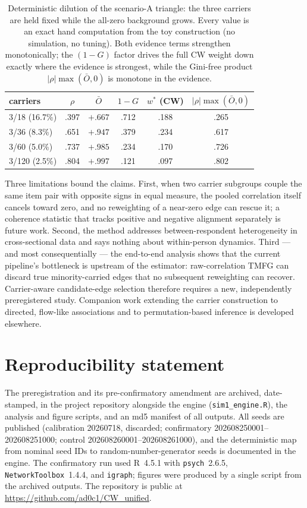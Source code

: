 \documentclass[11pt]{article}
\newcommand{\Obar}{\bar{O}}
\newcommand{\wstar}{w^{*}}
\begin{document}
\begin{table}[!htb]
\centering
\caption{Deterministic dilution of the scenario-A triangle: the three
carriers are held fixed while the all-zero background grows. Every value
is an exact hand computation from the toy construction (no simulation,
no tuning). Both evidence terms strengthen monotonically; the $(1-G)$
factor drives the full CW weight down exactly where the evidence is
strongest, while the Gini-free product $|\rho|\max(\Obar,0)$ is monotone
in the evidence.}
\label{tab:dilution}
\begin{tabular}{lccccc}
\toprule
carriers & $\rho$ & $\Obar$ & $1-G$ &
$\wstar$ (CW) & $|\rho|\max(\Obar,0)$\\
\midrule
3/18 (16.7\%)  & .397 & $+.667$ & .712 & .188 & .265\\
3/36 (8.3\%)   & .651 & $+.947$ & .379 & .234 & .617\\
3/60 (5.0\%)   & .737 & $+.985$ & .234 & .170 & .726\\
3/120 (2.5\%)  & .804 & $+.997$ & .121 & .097 & .802\\
\bottomrule
\end{tabular}
\end{table}

Three limitations bound the claims. First, when two carrier subgroups
couple the same item pair with opposite signs in equal measure, the pooled
correlation itself cancels toward zero, and no reweighting of a near-zero
edge can rescue it; a coherence statistic that tracks positive and
negative alignment separately is future work. Second, the method addresses
between-respondent heterogeneity in cross-sectional data and says nothing
about within-person dynamics. Third --- and most consequentially --- the
end-to-end analysis shows that the current pipeline's bottleneck is upstream
of the estimator: raw-correlation TMFG can discard true minority-carried edges
that no subsequent reweighting can recover. Carrier-aware candidate-edge
selection therefore requires a new, independently preregistered study.
Companion work
extending the carrier construction to directed, flow-like associations and
to permutation-based inference is developed elsewhere.

\section*{Reproducibility statement}
The preregistration and its pre-confirmatory amendment are archived,
date-stamped, in the project repository alongside the engine
(\texttt{sim1\_engine.R}), the analysis and figure scripts, and an md5
manifest of all outputs. All seeds are published (calibration 20260718,
discarded; confirmatory 202608250001--202608251000; control
202608260001--202608261000), and the deterministic map from nominal seed
IDs to random-number-generator seeds is documented in the engine. The confirmatory run used
R~4.5.1 with \texttt{psych}~2.6.5, \texttt{NetworkToolbox}~1.4.4, and
\texttt{igraph}; figures were produced by a single script from the archived
outputs. The repository is public at
\url{https://github.com/ad0c1/CW_unified}.
\end{document}
